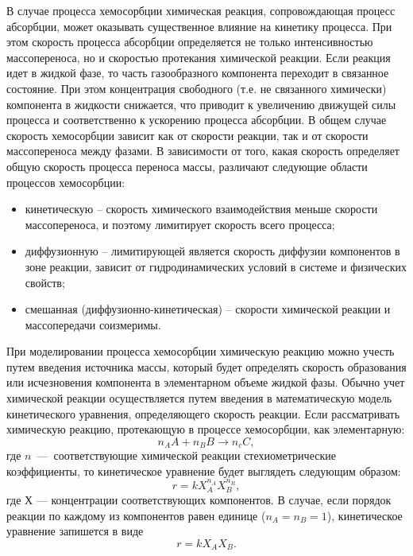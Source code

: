 В случае процесса хемосорбции химическая реакция, сопровождающая процесс абсорбции, может оказывать существенное влияние на кинетику процесса. При этом скорость процесса абсорбции определяется не только интенсивностью массопереноса, но и скоростью протекания химической реакции. Если реакция идет в жидкой фазе, то часть газообразного компонента переходит в связанное состояние. При этом концентрация свободного (т.е. не связанного химически) компонента в жидкости снижается, что приводит к увеличению движущей силы процесса и соответственно к ускорению процесса абсорбции. В общем случае скорость хемосорбции зависит как от скорости реакции, так и от скорости массопереноса между фазами. В зависимости от того, какая скорость определяет общую скорость процесса переноса массы, различают следующие области процессов хемосорбции:
\begin{itemize}
	\item кинетическую – скорость химического взаимодействия меньше скорости массопереноса, и поэтому лимитирует скорость всего процесса;
	\item  диффузионную – лимитирующей является скорость диффузии компонентов в зоне реакции, зависит от гидродинамических условий в системе и физических свойств;
	\item смешанная (диффузионно-кинетическая) – скорости химической реакции и массопередачи соизмеримы.
\end{itemize}

При моделировании процесса хемосорбции химическую реакцию можно учесть путем введения источника массы, который будет определять скорость образования или исчезновения компонента в элементарном объеме жидкой фазы. Обычно учет химической реакции осуществляется путем введения в математическую модель кинетического уравнения, определяющего скорость реакции. Если рассматривать химическую реакцию, протекающую в процессе хемосорбции, как элементарную:
\begin{equation}
	n_A A + n_B B \rightarrow n_c C,
\end{equation}
где $n$ --- соответствующие химической реакции стехиометрические коэффициенты, то кинетическое уравнение будет выглядеть следующим образом:
\begin{equation}
	r=k X_A^{n_A} X_B^{n_B},
\end{equation}
где $Х$ --- концентрации соответствующих компонентов. В случае, если порядок реакции по каждому из компонентов равен единице ($n_A=n_B=1$),  кинетическое уравнение запишется в виде
\begin{equation}
r=k X_A X_B.
\end{equation}

